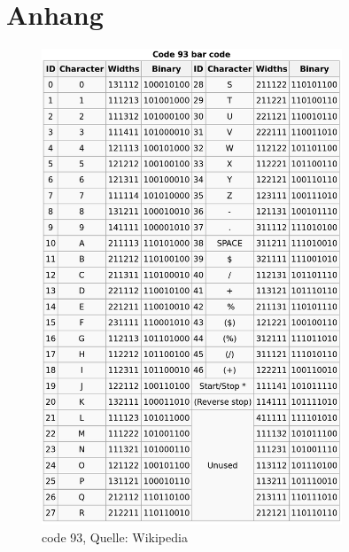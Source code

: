 \chapter{Anhang}
\label{chap:anhang}

  \begin{figure}[p]
    \centering
    \includegraphics[width=0.8\textwidth]{appendix/code93table.png}
    \caption[code 93 Tabelle]{code 93, Quelle: Wikipedia}
    \label{fig:code93table}
  \end{figure}